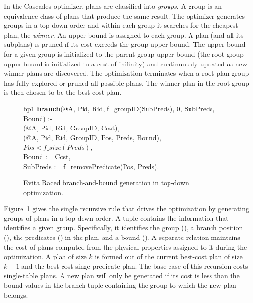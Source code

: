 In the Cascades optimizer, plans are classified into {\em groups}. A group is an equivalence class
of plans that produce the same result. The optimizer generates groups in a top-down order and
within each group it searches for the cheapest plan, the {\em winner}. An upper bound is assigned
to each group. A plan (and all its subplans) is pruned if its cost exceeds the group upper bound.
The upper bound for a given group is initialized to the parent group upper bound (the root group 
upper bound is initialized to a cost of inifinity) and continuously updated as new winner plans
are discovered. The optimization terminates when a root plan group has fully explored or pruned
all possible plans. The winner plan in the root group is then chosen to be the best-cost plan.


\begin{figure}
\ssp
\centering
\begin{boxedminipage}{\linewidth}
bp1 {\bf branch}(@A, Pid, Rid, f\_groupID(SubPreds), 0, SubPreds, Bound) :- \\
(@A, Pid, Rid, GroupID, Cost), \\
(@A, Pid, Rid, GroupID, Pos, Preds, Bound), \\
\datalogspace $Pos < f\_size(Preds)$, \\
\datalogspace Bound := Cost, \\
\datalogspace SubPreds := f\_removePredicate(Pos, Preds). \\
\end{boxedminipage}
\caption{\label{ch:evita:fig:bb} Evita Raced branch-and-bound generation in top-down optimization.}
\end{figure}

Figure~\ref{ch:evita:fig:bb} gives the single recursive rule that drives the optimization by generating groups of plans in a top-down
order. A  tuple contains the information that identifies a given group. Specifically, it identifies
the group (), a branch position (), the predicates () in the plan, and a
bound (). A separate  relation maintains the cost of plans computed from the
physical properties assigned to it during the optimization. A plan of size $k$ is formed out of the current
best-cost plan of size $k - 1$ and the best-cost singe predicate plan. The base case of this
recursion costs single-table plans. A new plan will only be generated if its cost is less than the bound
values in the branch tuple containing the group to which the new plan belongs. 


